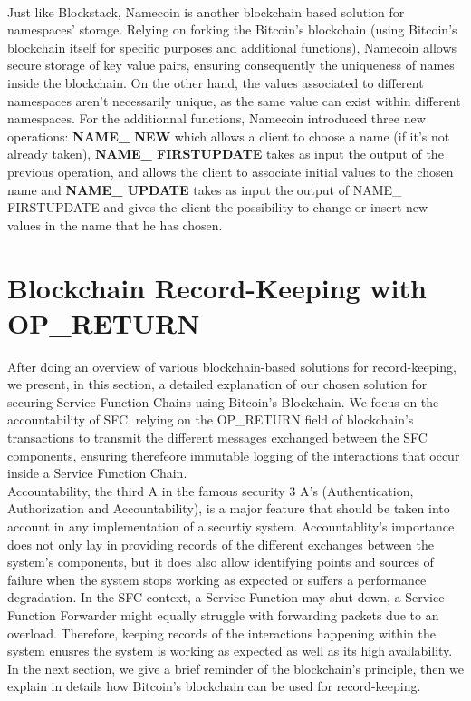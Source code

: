 \\
Just like Blockstack, Namecoin is another blockchain based solution for namespaces' storage. Relying on forking the Bitcoin's blockchain (using Bitcoin's blockchain itself for specific purposes and additional functions), Namecoin allows secure storage of key value pairs, ensuring consequently the uniqueness of names inside the blockchain. On the other hand, the values associated to different namespaces aren't necessarily unique, as the same value can exist within different namespaces. For the additionnal functions, Namecoin introduced three new operations: \textbf{NAME\_ NEW} which allows a client to choose a name (if it's not already taken), \textbf{NAME\_ FIRSTUPDATE} takes as input the output of the previous operation, and allows the client to associate initial values to the chosen name and \textbf{NAME\_ UPDATE}  takes as input the output of NAME\_ FIRSTUPDATE and gives the client the possibility to change or insert new values in the name that he has chosen.
\newpage
\section{Blockchain Record-Keeping with OP\_RETURN}
After doing an overview of various blockchain-based solutions for record-keeping, we present, in this section, a detailed explanation of our chosen solution for securing Service Function Chains using Bitcoin’s Blockchain. We focus on the accountability
of SFC, relying on the OP\_RETURN field of blockchain’s transactions to transmit the different messages exchanged between the SFC components,
ensuring therefeore immutable logging of the interactions that occur inside a Service Function Chain.\\
Accountability, the third A in the famous security 3 A's (Authentication, Authorization and Accountability), is a major feature that should be taken into account in any implementation of a securtiy system. Accountablity's importance does not only lay in providing records of the different exchanges between the system's components, but it does also allow identifying points and sources of failure when the system stops working as expected or suffers a performance degradation. In the SFC context, a Service Function may shut down, a Service Function Forwarder might equally struggle with forwarding packets due to an overload. Therefore, keeping records of the interactions happening within the system enusres the system is working as expected as well as its high availability. In the next section, we give a brief reminder of the blockchain's principle, then we explain in details how Bitcoin's blockchain can be used for record-keeping.
